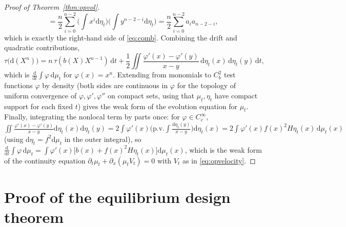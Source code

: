 \documentclass[11pt]{article}
\newcommand{\dd}{\mathrm{d}}
\newcommand{\pv}{\mathrm{p.v.}\!}
\theoremstyle{plain}
\theoremstyle{definition}
\theoremstyle{remark}
\begin{document}
\begin{proof}[Proof of Theorem~\ref{thm:opvol}]
\[  = \frac n2\sum_{i=0}^{n-2}\Big(\int x^i\dd\eta_t\Big)\Big(\int y^{n-2-i}\dd\eta_t\Big)
  = \frac n2\sum_{i=0}^{n-2}a_ia_{n-2-i},
\]
which is exactly the right-hand side of \eqref{eq:comb}. Combining the drift and
quadratic contributions,
\[
  \tau\big(\dd(X^n)\big) = n\,\tau(b(X)X^{n-1})\,\dd t
  + \frac12\iint\frac{\varphi'(x)-\varphi'(y)}{x-y}\,\dd\eta_t(x)\,\dd\eta_t(y)\,\dd t,
\]
which is $\frac{\dd}{\dd t}\int\varphi\,\dd\mu_t$ for $\varphi(x)=x^n$. Extending from
monomials to $C^2_b$ test functions $\varphi$ by density (both sides are continuous
in $\varphi$ for the topology of uniform convergence of $\varphi,\varphi',\varphi''$
on compact sets, using that $\mu_t,\eta_t$ have compact support for each fixed $t$)
gives the weak form of the evolution equation for $\mu_t$. Finally, integrating the
nonlocal term by parts once: for $\varphi\in C_c^\infty$,
$\iint\frac{\varphi'(x)-\varphi'(y)}{x-y}\dd\eta_t(x)\dd\eta_t(y)
=2\int\varphi'(x)\Big(\pv\!\int\frac{\dd\eta_t(y)}{x-y}\Big)\dd\eta_t(x)
=2\int\varphi'(x)f(x)^2H\eta_t(x)\,\dd\mu_t(x)$
(using $\dd\eta_t=f^2\dd\mu_t$ in the outer integral), so
$\frac{\dd}{\dd t}\int\varphi\,\dd\mu_t=\int\varphi'(x)\big[b(x)+f(x)^2H\eta_t(x)\big]
\dd\mu_t(x)$, which is the weak form of the continuity equation
$\partial_t\mu_t+\partial_x(\mu_tV_t)=0$ with $V_t$ as in \eqref{eq:opvelocity}.
\end{proof}

\section{Proof of the equilibrium design theorem}\label{app:design}
\end{document}
